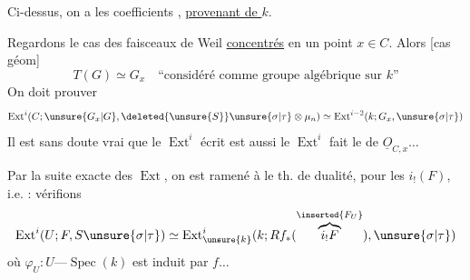 Ci-dessus, on a  les coefficients  , \uline{provenant de $k$}.

Regardons le cas des faisceaux de Weil \uline{concentrés} en un point $x\in C$. Alors  [cas géom]
\[
T(G)\simeq G_x\quad\text{``considéré comme groupe algébrique sur $k$''}
\]
On doit prouver
\[
\operatorname{Ext}^i(C;\unsure{G_x|G},\deleted{\unsure{S}}\unsure{\sigma|\tau}\otimes\mu_n)\simeq
\operatorname{Ext}^{i-2}(k;G_x,\unsure{\sigma|\tau})
\]
Il est sans doute vrai que le $\operatorname{Ext}^i$ écrit est aussi le $\operatorname{Ext}^i$  fait  le  de $\underline O_{C,x}\ldots$

Par la suite exacte des $\operatorname{Ext}$, on est ramené à 
le th. de dualité,  pour les  $i_!(F)$, i.e. : vérifions
\[
\operatorname{Ext}^i(U;F,S\unsure{\sigma|\tau})\simeq
\operatorname{Ext}^{i}_{\unsure{k}}(k;Rf_*(\overset{\inserted{F_U}}{\overbrace{i_!F}}),\unsure{\sigma|\tau})
\]
où $\varphi_U:U\text{---}\operatorname{Spec}(k)$ est induit par $f\ldots$


